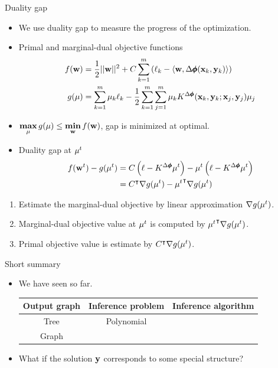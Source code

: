 \documentclass[first=dgreen,second=purple,logo=red]{aaltoslides}
\begin{document}
%
\begin{frame}{Duality gap}
	\begin{itemize}\footnotesize
		\item We use duality gap to measure the progress of the optimization.
		\item Primal and marginal-dual objective functions
		\begin{align*}\footnotesize
			f(\mathbf {w}) &= \frac{1}{2}||\mathbf {w}||^2 + C\sum_{k=1}^m\left(\ell_k-\langle \mathbf {w}, \Delta\pmb \phi(\mathbf {x}_k,\mathbf {y}_k) \rangle\right)\\
			g(\mathbf {\mu}) &= \sum_{k=1}^m\mu_k\ell_k - \frac{1}{2}\sum_{k=1}^m\sum_{j=1}^m\mu_kK^{\Delta\pmb \phi}(\mathbf {x}_k,\mathbf {y}_k;\mathbf {x}_j,\mathbf {y}_j)\mu_j
		\end{align*}
		\item $\underset{\mathbf {\mu}}{\textbf{max}}\,g(\mathbf {\mu})\le \underset{\mathbf {w}}{\textbf{min}}\,f(\mathbf {w})$, gap is minimized at optimal.
		\item Duality gap at $\mathbf {\mu}^t$
		\begin{align*}\footnotesize
			f(\mathbf {w}^t) - g(\mathbf {\mu}^t) &= C\left(\mathbf {\ell}-K^{\Delta\pmb \phi}\mathbf {\mu}^t\right) - \mathbf {\mu}^t\left(\mathbf {\ell}-K^{\Delta\pmb \phi}\mathbf {\mu}^t\right)\\
			&= C^{\intercal} \nabla g(\mathbf {\mu}^t) -{\mathbf {\mu}^t} ^{\intercal} \nabla g(\mathbf {\mu}^t)
		\end{align*}
	\end{itemize}
		\begin{enumerate}\footnotesize
			\item Estimate the marginal-dual objective by linear approximation $\nabla g(\mathbf {\mu}^t)$.
			\item Marginal-dual objective value at $\mathbf {\mu}^t$ is computed by ${\mathbf {\mu}^t} ^{\intercal} \nabla g(\mathbf {\mu}^t)$.
			\item Primal objective value is estimate by $C^{\intercal} \nabla g(\mathbf {\mu}^t)$.
		\end{enumerate}
\end{frame}

%
\begin{frame}{Short summary}
	\begin{itemize}\footnotesize
		\item We have seen so far. 
		\begin{tabular}{|c|c|c|}
			\hline
			\footnotesize
			 Output graph & Inference problem & Inference algorithm \\ \hline
			 Tree & Polynomial & \dpg\ \cite{Rousu07}  \\
			 Graph & \nphard & \lbp\ \cite{su10structured}  \\ \hline
		\end{tabular}
		\item What if the solution $\mathbf {y}$ corresponds to some special structure?
	\end{itemize}
\end{frame}
\end{document}
